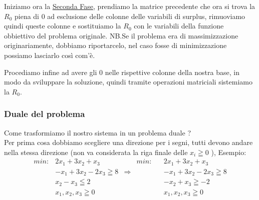 \documentclass{article}
\begin{document}
Iniziamo ora la \underline{Seconda Fase}, prendiamo la matrice precedente che ora si trova la $R_0$ piena di 0 ad esclusione delle colonne delle variabili di surplus, rimuoviamo quindi queste colonne e sostituiamo la $R_0$ con le variabili della funzione obbiettivo del problema originale.
NB.Se il problema era di massimizzazione originariamente, dobbiamo riportarcelo, nel caso fosse di minimizzazione possiamo lasciarlo così com'è.\\
\begin{center}
\end{center}

Procediamo infine ad avere gli 0 nelle rispettive colonne della nostra base, in modo da sviluppare la soluzione, quindi tramite operazioni matriciali sistemiamo la $R_0$.\\

\begin{center}
\end{center}

\subsubsection{Duale del problema}
Come trasformiamo il nostro sistema in un problema duale ?\\
Per prima cosa dobbiamo scegliere una direzione per i segni, tutti devono andare nella stessa direzione (non va considerata la riga finale delle $x_i \geqq 0$ ), Esempio:\\


\begin{align*}
min: &2x_1 + 3x_2 + x_3      &              &          min:& &2x_1 + 3x_2 + x_3\\
&-x_1 + 3x_2 - 2x_3 \geqq 8  & \Rightarrow  &                & &-x_1 + 3x_2 - 2x_3 \geqq 8\\
&x_2 - x_3 \leqq 2           &              & 			     & &-x_2 + x_3 \geqq -2\\
&x_1, x_2,x_3 \geqq 0        &              & 				 & &x_1, x_2,x_3 \geqq 0\\
\end{align*}
\end{document}
